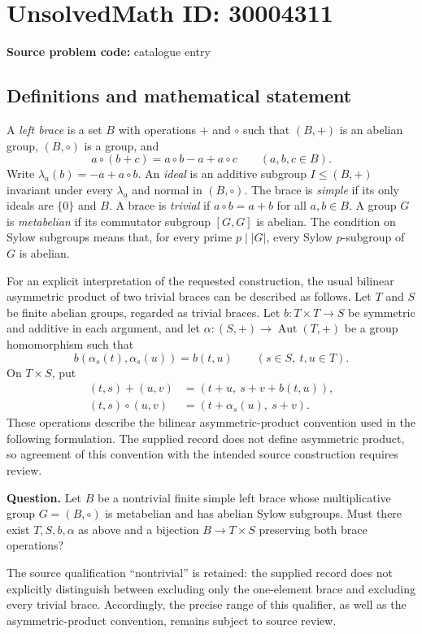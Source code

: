 \documentclass[11pt]{article}
\begin{document}
\section*{UnsolvedMath ID: 30004311}
\textbf{Source problem code:} catalogue entry
\subsection{Definitions and mathematical statement}
A \emph{left brace} is a set \(B\) with operations \(+\) and \(\circ\) such that \((B,+)\) is an abelian group, \((B,\circ)\) is a group, and
\[
a\circ(b+c)=a\circ b-a+a\circ c\qquad(a,b,c\in B).
\]
Write \(\lambda_a(b)=-a+a\circ b\). An \emph{ideal} is an additive subgroup \(I\leq (B,+)\) invariant under every \(\lambda_a\) and normal in \((B,\circ)\). The brace is \emph{simple} if its only ideals are \(\{0\}\) and \(B\). A brace is \emph{trivial} if \(a\circ b=a+b\) for all \(a,b\in B\). A group \(G\) is \emph{metabelian} if its commutator subgroup \([G,G]\) is abelian. The condition on Sylow subgroups means that, for every prime \(p\mid |G|\), every Sylow \(p\)-subgroup of \(G\) is abelian.

For an explicit interpretation of the requested construction, the usual bilinear asymmetric product of two trivial braces can be described as follows. Let \(T\) and \(S\) be finite abelian groups, regarded as trivial braces. Let \(b:T\times T\to S\) be symmetric and additive in each argument, and let \(\alpha:(S,+)\to\operatorname{Aut}(T,+)\) be a group homomorphism such that
\[
b(\alpha_s(t),\alpha_s(u))=b(t,u)
\qquad(s\in S,\ t,u\in T).
\]
On \(T\times S\), put
\[
\begin{aligned}
(t,s)+(u,v)&=(t+u,\ s+v+b(t,u)),\\
(t,s)\circ(u,v)&=(t+\alpha_s(u),\ s+v).
\end{aligned}
\]
These operations describe the bilinear asymmetric-product convention used in the following formulation. The supplied record does not define asymmetric product, so agreement of this convention with the intended source construction requires review.

\textbf{Question.} Let \(B\) be a nontrivial finite simple left brace whose multiplicative group \(G=(B,\circ)\) is metabelian and has abelian Sylow subgroups. Must there exist \(T,S,b,\alpha\) as above and a bijection \(B\to T\times S\) preserving both brace operations?

The source qualification ``nontrivial'' is retained: the supplied record does not explicitly distinguish between excluding only the one-element brace and excluding every trivial brace. Accordingly, the precise range of this qualifier, as well as the asymmetric-product convention, remains subject to source review.
\end{document}
